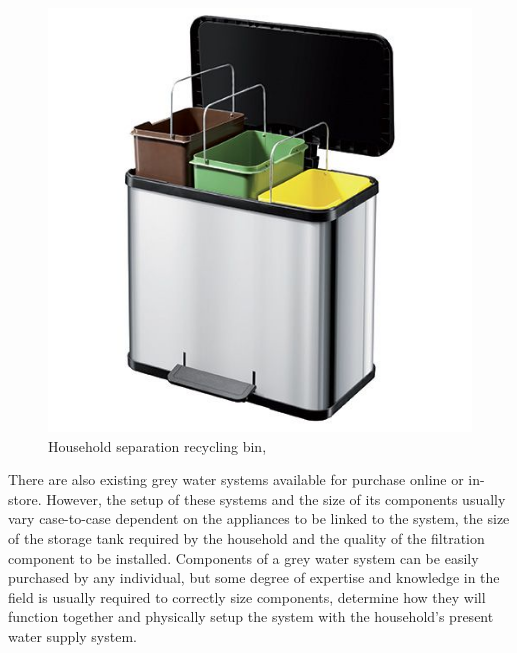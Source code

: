 \documentclass[a4paper,11pt,fleqn]{report}
\begin{document}
\begin{figure}[h!]
\begin{center}
\includegraphics[scale = 0.34]{HouseholdRecyclingBin.jpg}
\caption{Household separation recycling bin, \citep{Rbins2018}}
\label{fig: Household separation recycling bin}
\end{center}
\end{figure}

There are also existing grey water systems available for purchase online or in-store. However, the setup of these systems and the size of its components usually vary case-to-case dependent on the appliances to be linked to the system, the size of the storage tank required by the household and the quality of the filtration component to be installed. Components of a grey water system can be easily purchased by any individual, but some degree of expertise and knowledge in the field is usually required to correctly size components, determine how they will function together and physically setup the system with the household's present water supply system. 
\end{document}
